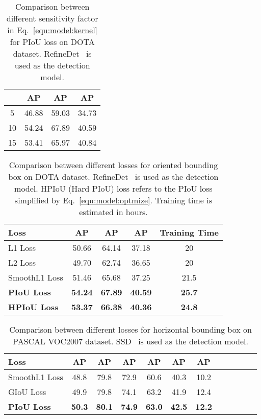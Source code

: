 \begin{table}[t!]
\small
\centering
\setlength{\tabcolsep}{20pt}
\caption{Comparison between different sensitivity factor  in Eq.~\ref{equ:model:kernel} for PIoU loss on DOTA dataset. RefineDet~\cite{refinedet} is used as the detection model.}
\vspace{-1mm}
\begin{tabular}{cccc}
\hline
    & AP   & AP & AP  \\ \hline
5  & 46.88 & 59.03 &  34.73 \\
10 & 54.24 & 67.89 & 40.59  \\
15  & 53.41& 65.97 & 40.84  \\ \hline
\end{tabular}
\vspace{-0.2em}
\label{tab:Different_hyperparameter}
\end{table}
\begin{table}[t!]
\small
\centering
\setlength{\tabcolsep}{12pt}
\caption{Comparison between different losses for oriented bounding box on DOTA dataset. RefineDet~\cite{refinedet} is used as the detection model. HPIoU (Hard PIoU) loss refers to the PIoU loss simplified by Eq.~\ref{equ:model:optmize}. Training time is estimated in hours.}
\vspace{-1mm}
\begin{tabular}{lcccc}
\hline
Loss    & AP   & AP & AP & Training Time  \\ \hline
L1 Loss     & 50.66 & 64.14 &  37.18 & 20 \\
L2 Loss     & 49.70 & 62.74 &  36.65 & 20 \\
SmoothL1 Loss & 51.46 & 65.68 & 37.25 & 21.5 \\
\textbf{PIoU Loss} & \textbf{54.24} & \textbf{67.89} & \textbf{40.59} & \textbf{25.7}  \\
\textbf{HPIoU Loss} & \textbf{53.37} & \textbf{66.38} & \textbf{40.36} & \textbf{24.8} \\ \hline
\end{tabular}
\vspace{-0.2em}
\label{tab:losses:dota}
\end{table}
\begin{table}[t!]
\small
\centering
\setlength{\tabcolsep}{7pt}
\caption{Comparison between different losses for horizontal bounding box on PASCAL VOC2007 dataset. SSD~\cite{Liu2016SSS} is used as the detection model.}
\vspace{-1mm}
\begin{tabular}{lccccccccccc}
\hline
Loss    & AP   & AP & AP & AP &AP & AP \\
\hline
SmoothL1 Loss & 48.8 & 79.8 & 72.9 & 60.6 & 40.3 & 10.2    \\
GIoU Loss~\cite{Rezatofighi2019GIO} & 49.9 & 79.8 & 74.1 & 63.2 & 41.9 & 12.4 \\
\textbf{PIoU Loss} & \textbf{50.3} & \textbf{80.1} & \textbf{74.9} & \textbf{63.0} & \textbf{42.5} & \textbf{12.2}  \\
\hline
\end{tabular}
\vspace{-3mm}
\label{tab:losses:voc}
\end{table}

